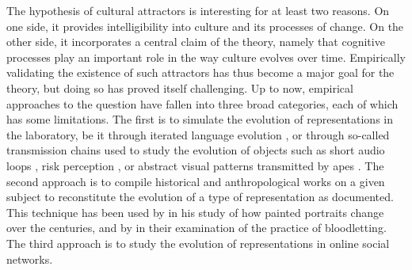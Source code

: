 \documentclass[english,]{article}
\begin{document}
The hypothesis of cultural attractors is interesting for at least two reasons.
On one side, it provides intelligibility into culture and its processes of change.
On the other side, it incorporates a central claim of the theory, namely that cognitive processes play an important role in the way culture evolves over time.
Empirically validating the existence of such attractors has thus become a major goal for the theory, but doing so has proved itself challenging.
Up to now, empirical approaches to the question have fallen into three broad categories, each of which has some limitations.
The first is to simulate the evolution of representations in the laboratory, be it through iterated language evolution \autocite[see][for a review]{tamariz_cultural_2016}, or through so-called transmission chains used to study the evolution of objects such as short audio loops \autocite{maccallum_evolution_2012}, risk perception \autocite{moussaid_amplification_2015}, or abstract visual patterns transmitted by apes \autocite{claidiere_cultural_2014}.
The second approach is to compile historical and anthropological works on a given subject to reconstitute the evolution of a type of representation as documented.
This technique has been used by \textcite{morin_how_2013} in his study of how painted portraits change over the centuries, and by \textcite{miton_universal_2015} in their examination of the practice of bloodletting.%
The third approach is to study the evolution of representations in online social networks.
\end{document}
